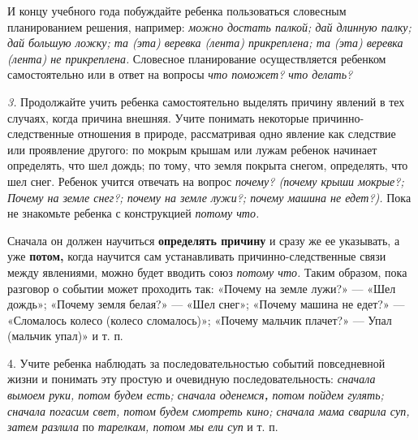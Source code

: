 \documentclass{book}
\renewcommand{\emph}[1]{\textit{#1}}
\begin{document}
И концу учебного года побуждайте ребенка пользоваться словесным
планированием решения, например: \emph{можно достать палкой; дай длинную
палку; дай большую ложку; та (эта) веревка (лента) прикреплена; та (эта)
веревка (лента) не прикреплена.} Словесное планирование осуществляется
ребенком самостоятельно или в ответ на вопросы \emph{что поможет? что
делать?}

\emph{3.} Продолжайте учить ребенка самостоятельно выделять причину
явлений в тех случаях, когда причина внешняя. Учите понимать некоторые
причинно-следственные отношения в природе, рассматривая одно явление как
следствие или проявление другого: по мокрым крышам или лужам ребенок
начинает определять, что шел дождь; по тому, что земля покрыта снегом,
определять, что шел снег. Ребенок учится отвечать на вопрос
\emph{почему? (почему крыши мокрые?; Почему на земле снег?; почему на
земле лужи?; почему машина не едет?).} Пока не знакомьте ребенка с
конструкцией \emph{потому что.}

Сначала он должен научиться \textbf{определять причину} и сразу же ее
указывать, а уже \textbf{потом,} когда научится сам устанавливать
причинно-следственные связи между явлениями, можно будет вводить союз
\emph{потому что.} Таким образом, пока разговор о событии может
проходить так: «Почему на земле лужи?» --- «Шел дождь»; «Почему земля
белая?» --- «Шел снег»; «Почему машина не едет?» --- «Сломалось колесо
(колесо сломалось)»; «Почему мальчик плачет?» --- Упал (мальчик упал)» и
т. п.

4. Учите ребенка наблюдать за последовательностью событий повседневной
жизни и понимать эту простую и очевидную последовательность:
\emph{сначала вымоем руки, потом будем есть; сначала оденемся\textbf{,}
потом пойдем гулять; сначала погасим свет, потом будем смотреть кино;
сначала мама сварила суп, затем разлила} по \emph{тарелкам, потом мы ели
суп} и т. п.
\end{document}
